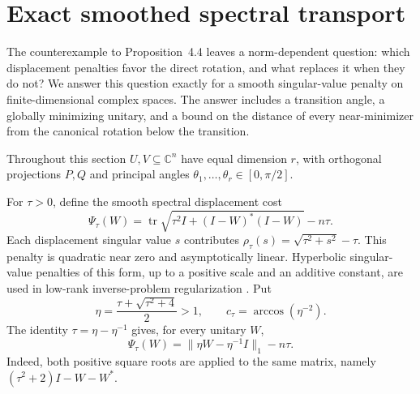 \section{Exact smoothed spectral transport}
\label{sec:smoothed-transport}

The counterexample to Proposition~4.4 leaves a norm-dependent question:
which displacement penalties favor the direct rotation, and what replaces
it when they do not? We answer this question exactly for a smooth
singular-value penalty on finite-dimensional complex spaces. The answer
includes a transition angle, a globally minimizing unitary, and a bound on
the distance of every near-minimizer from the canonical rotation below
the transition.

Throughout this section $U,V\subseteq\mathbb C^n$ have equal dimension
$r$, with orthogonal projections $P,Q$ and principal angles
$\theta_1,\ldots,\theta_r\in[0,\pi/2]$.

For $\tau>0$, define the smooth spectral displacement cost
\[
 \Psi_\tau(W)=\operatorname{tr}
  \sqrt{\tau^2I+(I-W)^*(I-W)}-n\tau.
\]
Each displacement singular value $s$ contributes
$\rho_\tau(s)=\sqrt{\tau^2+s^2}-\tau$. This penalty is quadratic near
zero and asymptotically linear. Hyperbolic singular-value penalties of
this form, up to a positive scale and an additive constant, are used in
low-rank inverse-problem regularization \citep{lobos2026smooth}. Put
\[
 \eta=\frac{\tau+\sqrt{\tau^2+4}}2>1,
 \qquad c_\tau=\arccos(\eta^{-2}).
\]
The identity $\tau=\eta-\eta^{-1}$ gives, for every unitary $W$,
\begin{equation}
 \Psi_\tau(W)=\|\eta W-\eta^{-1}I\|_1-n\tau.
 \label{eq:smoothed-weighted-nuclear}
\end{equation}
Indeed, both positive square roots are applied to the same matrix,
namely $(\tau^2+2)I-W-W^*$.

